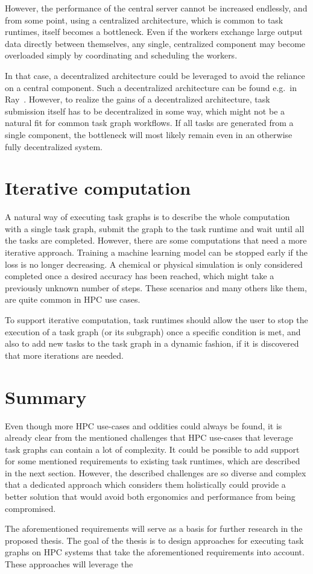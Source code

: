\begin{description}
	However, the performance of the central server cannot be increased endlessly, and from some point,
	using a centralized architecture, which is common to task runtimes, itself becomes a bottleneck.
	Even if the workers exchange large output data directly between themselves, any single, centralized
	component may become overloaded simply by coordinating and scheduling the workers.

	In that case, a decentralized architecture could be leveraged to avoid the reliance on a central
	component. Such a decentralized architecture can be found e.g.\ in Ray~\cite{ray}.
	However, to realize the gains of a decentralized architecture, task submission itself has to be
	decentralized in some way, which might not be a natural fit for common task graph workflows. If all
	tasks are generated from a single component, the bottleneck will most likely remain even in an
	otherwise fully decentralized system.
\end{description}


\section{Iterative computation}
A natural way of executing task graphs is to describe the whole computation with a single task
graph, submit the graph to the task runtime and wait until all the tasks are completed. However,
there are some computations that need a more iterative approach. Training a machine learning model
can be stopped early if the loss is no longer decreasing. A chemical or physical simulation is only
considered completed once a desired accuracy has been reached, which might take a previously
unknown number of steps. These scenarios and many others like them, are quite common in HPC use
cases.

To support iterative computation, task runtimes should allow the user to stop the execution of a
task graph (or its subgraph) once a specific condition is met, and also to add new tasks to the
task graph in a dynamic fashion, if it is discovered that more iterations are needed.


\section{Summary}
Even though more HPC use-cases and oddities could always be found, it is already clear from the
mentioned challenges that HPC use-cases that leverage task graphs can contain a lot of complexity.
It could be possible to add support for some mentioned requirements to existing task runtimes,
which are described in the next section. However, the described challenges are so diverse and
complex that a dedicated approach which considers them holistically could provide a better solution
that would avoid both ergonomics and performance from being compromised.

The aforementioned requirements will serve as a basis for further research in the proposed thesis.
The goal of the thesis is to design approaches for executing task graphs on HPC systems that take
the aforementioned requirements into account. These approaches will leverage the
